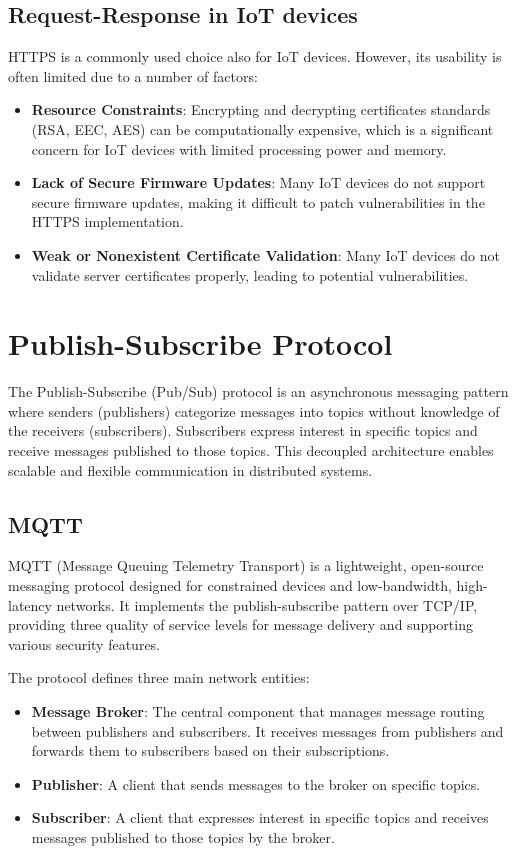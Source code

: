 \subsection{Request-Response in IoT devices}
HTTPS is a commonly used choice also for IoT devices. However, its usability is often limited due to a number of factors:
\begin{itemize}
    \item \textbf{Resource Constraints\cite{mazhar2023iotsecurity}}: Encrypting and decrypting certificates standards (RSA, EEC, AES) can be computationally expensive, which is a significant concern for IoT devices with limited processing power and memory.
    \item \textbf{Lack of Secure Firmware Updates\cite{cyberark2024iot}}: Many IoT devices do not support secure firmware updates, making it difficult to patch vulnerabilities in the HTTPS implementation.
    \item \textbf{Weak or Nonexistent Certificate Validation\cite{bishopfox2020weakcertificates}}: Many IoT devices do not validate server certificates properly, leading to potential vulnerabilities.
\end{itemize}

\section{Publish-Subscribe Protocol}
The Publish-Subscribe (Pub/Sub) protocol is an asynchronous messaging pattern where senders (publishers) categorize messages into topics without knowledge of the receivers (subscribers). Subscribers express interest in specific topics and receive messages published to those topics. This decoupled architecture enables scalable and flexible communication in distributed systems.

\subsection{MQTT}
MQTT (Message Queuing Telemetry Transport) is a lightweight, open-source messaging protocol designed for constrained devices and low-bandwidth, high-latency networks. It implements the publish-subscribe pattern over TCP/IP, providing three quality of service levels for message delivery and supporting various security features.

The protocol defines three main network entities:
\begin{itemize}
    \item \textbf{Message Broker}: The central component that manages message routing between publishers and subscribers. It receives messages from publishers and forwards them to subscribers based on their subscriptions.
    \item \textbf{Publisher}: A client that sends messages to the broker on specific topics. 
    \item \textbf{Subscriber}: A client that expresses interest in specific topics and receives messages published to those topics by the broker.
\end{itemize}

